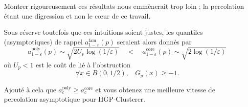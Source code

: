 Montrer rigoureusement ces résultats nous emmènerait trop loin ; la percolation étant une digression et non le c\oe ur de ce travail.

Sous réserve toutefois que ces intuitions soient justes, les quantiles (asymptotiques) de rappel $a_{1-\varepsilon}^{\mathrm{fam}}(p)$ seraient alors donnés par
\[
    a_{1-\varepsilon}^{\mathrm{poly}}(p) \sim \sqrt{ 2U_p\log(1/\varepsilon) } \quad < \quad a_{1-\varepsilon}^{\mathrm{core}}(p) \sim \sqrt{ 2\log(1/\varepsilon) }
\]
où $U_p <1$ est le coût de lié à l'obstruction 
\[
\forall x \in B(0 , 1/2) , \ \ \ \ G_p(x) \ge -1.
\]

Ajouté à cela que $a_c^{\mathrm{poly}} \ge a_c^{\mathrm{core}}$ et vous obtenez une meilleure vitesse de percolation asymptotique pour HGP-Clusterer.



